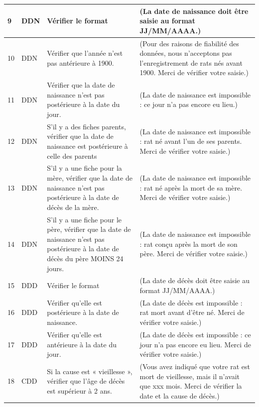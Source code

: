 \documentclass[a4paper,10pt]{article}
\begin{document}
\begin{tabular}{|p{0.35cm}|p{1.35cm}|p{5cm}|p{8.5cm}|}
9 & DDN & Vérifier le format & (La date de naissance doit être saisie au format JJ/MM/AAAA.)\\\hline


10 & DDN & Vérifier que l'année n'est pas antérieure à 1900. & (Pour des raisons de fiabilité des données, nous n'acceptons pas l'enregistrement de rats nés avant 1900. Merci de vérifier votre saisie.)\\\hline


11 & DDN & Vérifier que la date de naissance n'est pas postérieure à la date du jour.& (La date de naissance est impossible : ce jour n'a pas encore eu lieu.)\\\hline


12 & DDN & S'il y a des fiches parents, vérifier que la date de naissance est postérieure à celle des parents & (La date de naissance est impossible : rat né avant l'un de ses parents. Merci de vérifier votre saisie.)\\\hline


13 & DDN & S'il y a une fiche pour la mère, vérifier que la date de naissance n'est pas postérieure à la date de décès de la mère. & (La date de naissance est impossible : rat né après la mort de sa mère. Merci de vérifier votre saisie.)\\\hline


14 & DDN & S'il y a une fiche pour le père, vérifier que la date de naissance n'est pas postérieure à la date de décès du père MOINS 24 jours. & (La date de naissance est impossible : rat conçu après la mort de son père. Merci de vérifier votre saisie.)\\\hline


15 & DDD & Vérifier le format & (La date de décès doit être saisie au format JJ/MM/AAAA.)\\\hline


16 & DDD & Vérifier qu'elle est postérieure à la date de naissance. & (La date de décès est impossible : rat mort avant d'être né. Merci de vérifier votre saisie.)\\\hline


17 & DDD & Vérifier qu'elle est antérieure à la date du jour. & (La date de décès est impossible : ce jour n'a pas encore eu lieu. Merci de vérifier votre saisie.)\\\hline


18 & CDD & Si la cause est « vieillesse », vérifier que l'âge de décès est supérieur à 2 ans. & (Vous avez indiqué que votre rat est mort de vieillesse, mais il n'avait que xxx mois. Merci de vérifier la date et la cause de décès.)\\\hline



\end{tabular}
\end{document}
